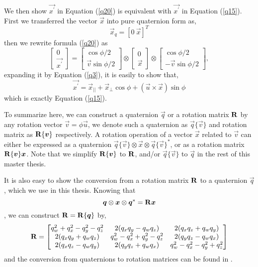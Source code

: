 We then show $\vec{x^{\prime}}$ in Equation (\ref{q20}) is equivalent with $\vec{x^{\prime}}$ in Equation (\ref{q15}). First we transferred the vector $\vec{x}$ into pure quaternion form as,
\begin{equation}\label{q21}
	\vec{x}_q = \left[0 \ \vec{x} \right]^T
\end{equation}
then we rewrite formula (\ref{q20}) as
\begin{equation}\label{q22}
\begin{bmatrix}
0  \\ \vec{x^{\prime}} 
\end{bmatrix}
=
\begin{bmatrix}
\cos{\phi / 2}  \\ \vec{v}\sin{\phi / 2} 
\end{bmatrix}
\otimes
\begin{bmatrix}
0  \\ \vec{x} 
\end{bmatrix}
\otimes
\begin{bmatrix}
\cos{\phi / 2}  \\ -\vec{v}\sin{\phi / 2}  
\end{bmatrix},
\end{equation}
expanding it by Equation (\ref{q3}), it is easily to show that,
\begin{equation}\label{q23}
	\vec{x^{\prime}} = \vec{x}_{||} + \vec{x}_{\bot}\cos{\phi} + (\vec{u} \times \vec{x})\sin{\phi}
\end{equation}
which is exactly Equation (\ref{q15}).

To summarize here, we can construct a quaternion $\vec{q}$ or a rotation matrix $\mathbf{R}$ by any rotation vector $\vec{v} = \phi\vec{u}$, we denote such a quaternion as $\vec{q} \{ \vec{v} \}$ and rotation matrix as $\mathbf{R} \{ \boldsymbol{v} \}$ respectively. A rotation operation of a vector $\vec{x}$ related to $\vec{v}$ can either be expressed as a quaternion $\vec{q} \{ \vec{v} \} \otimes \vec{x} \otimes \vec{q} \{ \vec{v} \}^{*}$, or as a rotation matrix $\mathbf{R} \{ \boldsymbol{v} \}\boldsymbol{x}$. Note that we simplify $\mathbf{R} \{ \boldsymbol{v} \}$ to $\mathbf{R}$, and/or $\vec{q} \{ \vec{v} \}$ to $\vec{q}$ in the rest of this master thesis.

It is also easy to show the conversion from a rotation matrix $\mathbf{R}$ to a quaternion $\vec{q}$, which we use in this thesis. Knowing that
\begin{equation}\label{q24}
	\boldsymbol{q} \otimes \boldsymbol{x} \otimes \boldsymbol{q}^{*} = \mathbf{R}\boldsymbol{x}
\end{equation}
, we can construct $\mathbf{R} = \mathbf{R} \{ \boldsymbol{q} \}$ by,
\begin{equation}\label{q25}
\mathbf{R} = \begin{bmatrix}
		q_w^2+q_x^2-q_y^2-q_z^2 & 2(q_xq_y-q_wq_z) & 2(q_xq_z+q_wq_y) \\
		2(q_xq_y+q_wq_z) & q_w^2-q_x^2+q_y^2-q_z^2 & 2(q_yq_z-q_wq_x)\\
		2(q_xq_z-q_wq_y) & 2(q_yq_z+q_wq_x) & q_w^2-q_x^2-q_y^2+q_z^2 \\
	  \end{bmatrix}
\end{equation} 
and the conversion from quaternions to rotation matrices can be found in \cite{van2005quaternion}.

